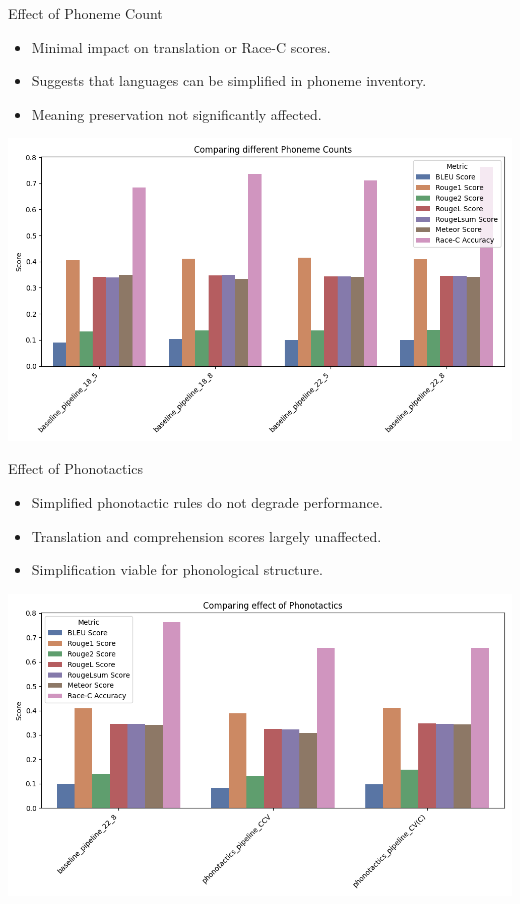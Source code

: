 \documentclass{beamer}
\begin{document}
\begin{frame}{Effect of Phoneme Count}
	\begin{itemize}
		\item Minimal impact on translation or Race-C scores.
		\item Suggests that languages can be simplified in phoneme inventory.
		\item Meaning preservation not significantly affected.
	\end{itemize}
	\includegraphics[width=0.7\linewidth]{figures/results/1_effect_of_phoneme_count.png}
\end{frame}

\begin{frame}{Effect of Phonotactics}
	\begin{itemize}
		\item Simplified phonotactic rules do not degrade performance.
		\item Translation and comprehension scores largely unaffected.
		\item Simplification viable for phonological structure.
	\end{itemize}
	\includegraphics[width=0.7\linewidth]{figures/results/1_effect_of_phonotactics.png}
\end{frame}
\end{document}

